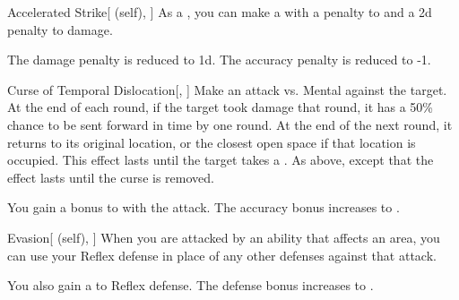 \lowercase{\hypertarget{spell:Accelerated Strike}{}}\label{spell:Accelerated Strike}
\begin{attuneability}[Rank 4]{\hypertarget{spell:Accelerated Strike}{Accelerated Strike}}[ (self), ]
As a , you can make a  with a  penalty to  and a \minus2d penalty to damage.

\rankline
{} The damage penalty is reduced to \minus1d.
 The accuracy penalty is reduced to -1.
\end{attuneability}
\vspace{0.25em}



\lowercase{\hypertarget{spell:Curse of Temporal Dislocation}{}}\label{spell:Curse of Temporal Dislocation}
\begin{freeability}[Rank 4]{\hypertarget{spell:Curse of Temporal Dislocation}{Curse of Temporal Dislocation}}[, ]
Make an attack vs. Mental against the target.
\hit At the end of each round, if the target took damage that round, it has a 50\% chance to be sent forward in time by one round.
At the end of the next round, it returns to its original location, or the closest open space if that location is occupied.
This effect lasts until the target takes a .
\crit As above, except that the effect lasts until the curse is removed.

\rankline
{} You gain a  bonus to  with the attack.
 The accuracy bonus increases to .
\end{freeability}
\vspace{0.25em}



\lowercase{\hypertarget{spell:Evasion}{}}\label{spell:Evasion}
\begin{attuneability}[Rank 4]{\hypertarget{spell:Evasion}{Evasion}}[ (self), ]
When you are attacked by an ability that affects an area, you can use your Reflex defense in place of any other defenses against that attack.

\rankline
{} You also gain a   to Reflex defense.
 The defense bonus increases to .
\end{attuneability}
\vspace{0.25em}



